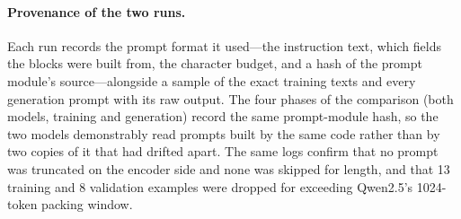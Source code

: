 \paragraph{Provenance of the two runs.}
Each run records the prompt format it used---the instruction text, which fields the blocks were built from, the character budget, and a hash of the prompt module's source---alongside a sample of the exact training texts and every generation prompt with its raw output.
The four phases of the comparison (both models, training and generation) record the same prompt-module hash, so the two models demonstrably read prompts built by the same code rather than by two copies of it that had drifted apart.
The same logs confirm that no prompt was truncated on the encoder side and none was skipped for length, and that \num{13} training and \num{8} validation examples were dropped for exceeding Qwen2.5's \num{1024}-token packing window.

